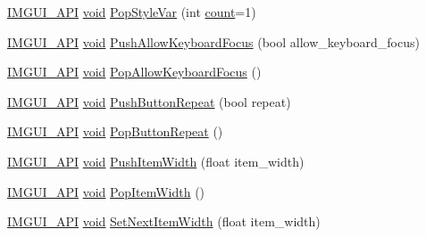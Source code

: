 \begin{DoxyCompactItemize}
\item 
\hyperlink{imgui_8h_a43829975e84e45d1149597467a14bbf5}{I\+M\+G\+U\+I\+\_\+\+A\+PI} \hyperlink{imgui__impl__opengl3__loader_8h_ac668e7cffd9e2e9cfee428b9b2f34fa7}{void} \hyperlink{namespaceImGui_a14116e57d81e326adef2a702e65781d4}{Pop\+Style\+Var} (int \hyperlink{imgui__impl__opengl3__loader_8h_a619bc20e8198de3bd3f3d7fc34de66b2}{count}=1)
\item 
\hyperlink{imgui_8h_a43829975e84e45d1149597467a14bbf5}{I\+M\+G\+U\+I\+\_\+\+A\+PI} \hyperlink{imgui__impl__opengl3__loader_8h_ac668e7cffd9e2e9cfee428b9b2f34fa7}{void} \hyperlink{namespaceImGui_adf7c3cfdcbb06617bb70ff1526d064f4}{Push\+Allow\+Keyboard\+Focus} (bool allow\+\_\+keyboard\+\_\+focus)
\item 
\hyperlink{imgui_8h_a43829975e84e45d1149597467a14bbf5}{I\+M\+G\+U\+I\+\_\+\+A\+PI} \hyperlink{imgui__impl__opengl3__loader_8h_ac668e7cffd9e2e9cfee428b9b2f34fa7}{void} \hyperlink{namespaceImGui_a017db69016de97685aec978e504dc96d}{Pop\+Allow\+Keyboard\+Focus} ()
\item 
\hyperlink{imgui_8h_a43829975e84e45d1149597467a14bbf5}{I\+M\+G\+U\+I\+\_\+\+A\+PI} \hyperlink{imgui__impl__opengl3__loader_8h_ac668e7cffd9e2e9cfee428b9b2f34fa7}{void} \hyperlink{namespaceImGui_a61d3e0191d67bedaf45f0178f87e3125}{Push\+Button\+Repeat} (bool repeat)
\item 
\hyperlink{imgui_8h_a43829975e84e45d1149597467a14bbf5}{I\+M\+G\+U\+I\+\_\+\+A\+PI} \hyperlink{imgui__impl__opengl3__loader_8h_ac668e7cffd9e2e9cfee428b9b2f34fa7}{void} \hyperlink{namespaceImGui_a0f883e8507be797ca8ba1448d2b9dbb0}{Pop\+Button\+Repeat} ()
\item 
\hyperlink{imgui_8h_a43829975e84e45d1149597467a14bbf5}{I\+M\+G\+U\+I\+\_\+\+A\+PI} \hyperlink{imgui__impl__opengl3__loader_8h_ac668e7cffd9e2e9cfee428b9b2f34fa7}{void} \hyperlink{namespaceImGui_a4ad13bf38f0521a339133248ef3e3036}{Push\+Item\+Width} (float item\+\_\+width)
\item 
\hyperlink{imgui_8h_a43829975e84e45d1149597467a14bbf5}{I\+M\+G\+U\+I\+\_\+\+A\+PI} \hyperlink{imgui__impl__opengl3__loader_8h_ac668e7cffd9e2e9cfee428b9b2f34fa7}{void} \hyperlink{namespaceImGui_ad29a3fc0cb5dfc7f9fc7224512ce90bf}{Pop\+Item\+Width} ()
\item 
\hyperlink{imgui_8h_a43829975e84e45d1149597467a14bbf5}{I\+M\+G\+U\+I\+\_\+\+A\+PI} \hyperlink{imgui__impl__opengl3__loader_8h_ac668e7cffd9e2e9cfee428b9b2f34fa7}{void} \hyperlink{namespaceImGui_a1291228607bee5a703df6553f27cbbb9}{Set\+Next\+Item\+Width} (float item\+\_\+width)
\item 

\end{DoxyCompactItemize}
